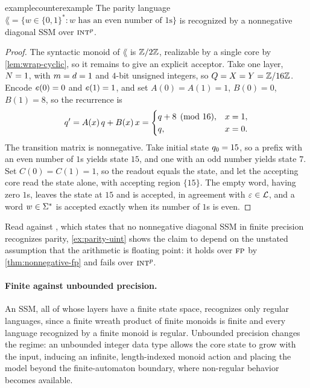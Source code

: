 \documentclass{article}
\begin{document}
\begin{restatable}{example}{counterexample}\label{ex:parity-uint}
The parity language $\lang = \{ w \in \{0,1\}^* : w \text{ has an even number of } 1\text{s} \}$ is recognized by a nonnegative diagonal SSM over $\textsc{int}^p$.
\end{restatable}

\begin{proof}
The syntactic monoid of $\lang$ is $\mathbb{Z}/{2}\mathbb{Z}$, realizable by a single core by \cref{lem:wrap-cyclic}, so it remains to give an explicit acceptor.
Take one layer, $N = 1$, with $m = d = 1$ and $4$-bit unsigned integers, so $Q = X = Y = \mathbb{Z}/16\mathbb{Z}$.
Encode $e(0) = 0$ and $e(1) = 1$, and set $A(0) = A(1) = 1$, $B(0) = 0$, $B(1) = 8$, so the recurrence is
$$
q' = A(x)\,q + B(x)\,x =
\begin{cases}
q + 8 \pmod{16}, & x = 1, \\
q, & x = 0.
\end{cases}
$$
The transition matrix is nonnegative.
Take initial state $q_0 = 15$, so a prefix with an even number of $1$s yields state $15$, and one with an odd number yields state $7$.
Set $C(0) = C(1) = 1$, so the readout equals the state, and let the accepting core read the state alone, with accepting region $\{15\}$.
The empty word, having zero $1$s, leaves the state at $15$ and is accepted, in agreement with $\varepsilon \in \mathcal{L}$, and a word $w \in \Sigma^*$ is accepted exactly when its number of $1$s is even.
\end{proof}

Read against \citet[Theorem 2]{sarrof2024expressive}, which states that no nonnegative diagonal SSM in finite precision recognizes parity, \cref{ex:parity-uint} shows the claim to depend on the unstated assumption that the arithmetic is floating point: it holds over $\textsc{fp}$ by \cref{thm:nonnegative-fp} and fails over $\textsc{int}^p$.

\paragraph{Finite against unbounded precision.}
An SSM, all of whose layers have a finite state space, recognizes only regular languages, since a finite wreath product of finite monoids is finite and every language recognized by a finite monoid is regular.
Unbounded precision changes the regime: an unbounded integer data type allows the core state to grow with the input, inducing an infinite, length-indexed monoid action and placing the model beyond the finite-automaton boundary, where non-regular behavior becomes available.
\end{document}
